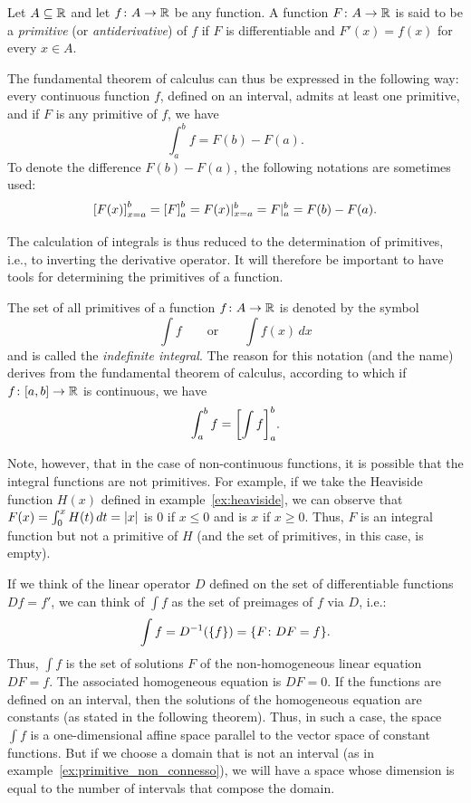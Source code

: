 \begin{definition}[Primitive]
\label{def:primitiva}%
\mymark{***}%
Let $A \subseteq {\mathbb R}$ and let $f\colon A \to {\mathbb R}$ be any function.
A function $F\colon A \to {\mathbb R}$ is said to be a \emph{primitive}%
%
(or \emph{antiderivative})
of $f$ if $F$ is differentiable and $F'(x)=f(x)$ for every $x\in A$.
\end{definition}

The fundamental theorem of calculus can thus be expressed in
the following way: every continuous function $f$, defined on an interval,
admits at least one primitive, and if $F$ is any primitive of $f$, we have
\[
  \int_a^b f = F(b) - F(a).
\]
To denote the difference $F(b)-F(a)$, the following notations are sometimes
used:
\[
  {\left[ F(x) \right]}_{x=a}^b = {\left[ F \right]}_a^b
  = F(x) \vert_{x=a}^b
  = F \vert_a^b = F(b) - F(a).
\]

The calculation of integrals is thus reduced to the determination of primitives,
i.e., to inverting the derivative operator.
It will therefore be important to have tools for determining the primitives
of a function.

\begin{definition}
\mymark{***}
The set of all primitives of a function $f\colon A \to {\mathbb R}$
is denoted by the symbol
\[
  \int f
  \qquad\text{or}\qquad
  \int f(x) \, dx
\]
and is called the \emph{indefinite integral}.
The reason for this notation (and the name) derives from the fundamental theorem
of
calculus, according to which if $f\colon[a,b]\to {\mathbb R}$
is continuous, we have
\[
  \int_a^b f = {\left[ \int f \right]}_a^b.
\]
\end{definition}

\begin{remark}
Note, however, that in the case of non-continuous functions, it is possible
that the integral functions are not primitives. For example,
if we take the Heaviside function $H(x)$ defined in example~\ref{ex:heaviside},
we can observe that $F(x)=\int_0^x H(t)\, dt = {\left|x\right|}$
is $0$ if $x \le 0$ and is $x$ if $x \ge 0$.
Thus, $F$ is an integral function but not a primitive of $H$
(and the set of primitives, in this case, is empty).
\end{remark}

If we think of the linear operator $D$ defined on the set of differentiable
functions
$Df = f'$,
we can think of $\int f$ as the set of preimages of $f$
via $D$, i.e.:
\[
  \int f = D^{-1}({\left\{ f \right\}}) = {\left\{ F \colon DF =f  \right\}}.
\]
Thus, $\int f$ is the set of solutions $F$ of the non-homogeneous linear
equation
$DF =f$. The associated homogeneous equation is $DF = 0$.
If the functions are defined on an interval, then the solutions of the
homogeneous equation are constants (as stated in the following theorem).
Thus, in such a case, the space $\int f$ is a one-dimensional affine space
parallel to the vector space of constant functions. 
But if we choose a domain that is not an interval 
(as in example~\ref{ex:primitive_non_connesso}), 
we will have a space whose dimension is equal to the number of intervals that
compose the domain.

